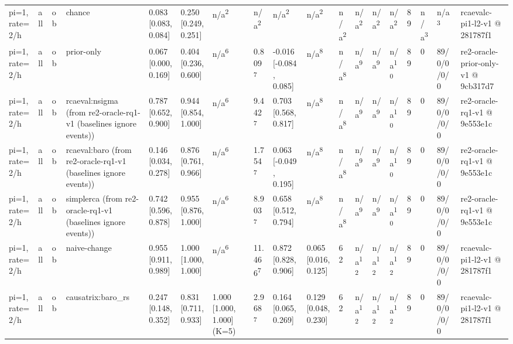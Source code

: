 \begin{table}[t]
\begin{tabular}{llllllllllllllllll}
pi=1, rate=2/h & all & ob & chance & 0.083 [0.083, 0.084] & 0.250 [0.249, 0.251] & n/a\textsuperscript{2} & n/a\textsuperscript{2} & n/a\textsuperscript{2} & n/a\textsuperscript{2} & n/a\textsuperscript{2} & n/a\textsuperscript{2} & n/a\textsuperscript{2} & n/a\textsuperscript{2} & 89 & n/a\textsuperscript{3} & n/a\textsuperscript{3} & rcaevalc-pi1-l2-v1 @ 281787f1 \\
pi=1, rate=2/h & all & ob & prior-only & 0.067 [0.000, 0.169] & 0.404 [0.236, 0.600] & n/a\textsuperscript{6} & 0.809\textsuperscript{7} & -0.016 [-0.084, 0.085] & n/a\textsuperscript{8} & n/a\textsuperscript{8} & n/a\textsuperscript{9} & n/a\textsuperscript{9} & n/a\textsuperscript{10} & 89 & 0 & 89/0/0/0/0 & re2-oracle-prior-only-v1 @ 9cb317d7 \\
pi=1, rate=2/h & all & ob & rcaeval:nsigma (from re2-oracle-rq1-v1 (baselines ignore events)) & 0.787 [0.652, 0.900] & 0.944 [0.854, 1.000] & n/a\textsuperscript{6} & 9.442\textsuperscript{7} & 0.703 [0.568, 0.817] & n/a\textsuperscript{8} & n/a\textsuperscript{8} & n/a\textsuperscript{9} & n/a\textsuperscript{9} & n/a\textsuperscript{10} & 89 & 0 & 89/0/0/0/0 & re2-oracle-rq1-v1 @ 9e553e1c \\
pi=1, rate=2/h & all & ob & rcaeval:baro (from re2-oracle-rq1-v1 (baselines ignore events)) & 0.146 [0.034, 0.278] & 0.876 [0.761, 0.966] & n/a\textsuperscript{6} & 1.754\textsuperscript{7} & 0.063 [-0.049, 0.195] & n/a\textsuperscript{8} & n/a\textsuperscript{8} & n/a\textsuperscript{9} & n/a\textsuperscript{9} & n/a\textsuperscript{10} & 89 & 0 & 89/0/0/0/0 & re2-oracle-rq1-v1 @ 9e553e1c \\
pi=1, rate=2/h & all & ob & simplerca (from re2-oracle-rq1-v1 (baselines ignore events)) & 0.742 [0.596, 0.878] & 0.955 [0.876, 1.000] & n/a\textsuperscript{6} & 8.903\textsuperscript{7} & 0.658 [0.512, 0.794] & n/a\textsuperscript{8} & n/a\textsuperscript{8} & n/a\textsuperscript{9} & n/a\textsuperscript{9} & n/a\textsuperscript{10} & 89 & 0 & 89/0/0/0/0 & re2-oracle-rq1-v1 @ 9e553e1c \\
pi=1, rate=2/h & all & ob & naive-change & 0.955 [0.911, 0.989] & 1.000 [1.000, 1.000] & n/a\textsuperscript{6} & 11.466\textsuperscript{7} & 0.872 [0.828, 0.906] & 0.065 [0.016, 0.125] & 62 & n/a\textsuperscript{12} & n/a\textsuperscript{12} & n/a\textsuperscript{12} & 89 & 0 & 89/0/0/0/0 & rcaevalc-pi1-l2-v1 @ 281787f1 \\
pi=1, rate=2/h & all & ob & causatrix:baro\_rs & 0.247 [0.148, 0.352] & 0.831 [0.711, 0.933] & 1.000 [1.000, 1.000] (K=5) & 2.968\textsuperscript{7} & 0.164 [0.065, 0.269] & 0.129 [0.048, 0.230] & 62 & n/a\textsuperscript{12} & n/a\textsuperscript{12} & n/a\textsuperscript{12} & 89 & 0 & 89/0/0/0/0 & rcaevalc-pi1-l2-v1 @ 281787f1 \\

\end{tabular}
\end{table}
